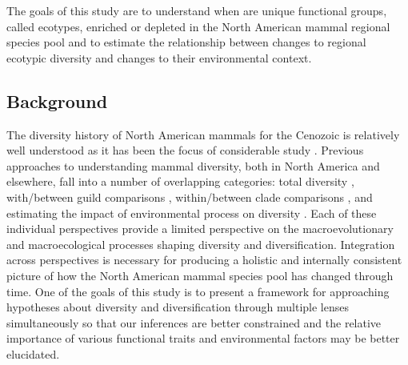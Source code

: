 The goals of this study are to understand when are unique functional groups, called ecotypes, enriched or depleted in the North American mammal regional species pool and to estimate the relationship between changes to regional ecotypic diversity and changes to their environmental context.

\subsection*{Background}

The diversity history of North American mammals for the Cenozoic is relatively well understood as it has been the focus of considerable study \citep{Alroy2009,Alroy1996a,Janis1993b,Alroy2000g,Figueirido2012,Pires2015a,Fraser2015a,Smits2015b,Quental2013,Slater2015c,Silvestro2015b,Badgley2013,Blois2009,Janis1993c}. Previous approaches to understanding mammal diversity, both in North America and elsewhere, fall into a number of overlapping categories: total diversity \citep{Alroy2000g,Alroy1996a,Figueirido2012,Liow2008}, with/between guild comparisons \citep{Janis2004,Janis2000,Jernvall2004,Janis1993c,Pires2015a,Janis2008a}, within/between clade comparisons \citep{Quental2013,Slater2015c,Silvestro2015b,Fraser2015a,Cantalapiedra2017}, and estimating the impact of environmental process on diversity \citep{Blois2009,Janis1993c,Janis1993b,Fraser2015a,Eronen2015,Badgley2013,Badgley2017,Alroy2000g}. Each of these individual perspectives provide a limited perspective on the macroevolutionary and macroecological processes shaping diversity and diversification. Integration across perspectives is necessary for producing a holistic and internally consistent picture of how the North American mammal species pool has changed through time. One of the goals of this study is to present a framework for approaching hypotheses about diversity and diversification through multiple lenses simultaneously so that our inferences are better constrained and the relative importance of various functional traits and environmental factors may be better elucidated.

